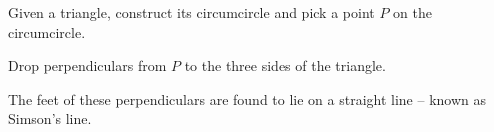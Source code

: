 Given a triangle, construct its circumcircle and pick a point $P$ 
on the circumcircle.
\par
Drop perpendiculars from $P$ to the three sides of the
triangle.
\par
The feet of these perpendiculars are found to lie on a straight line -- 
known as Simson's line.